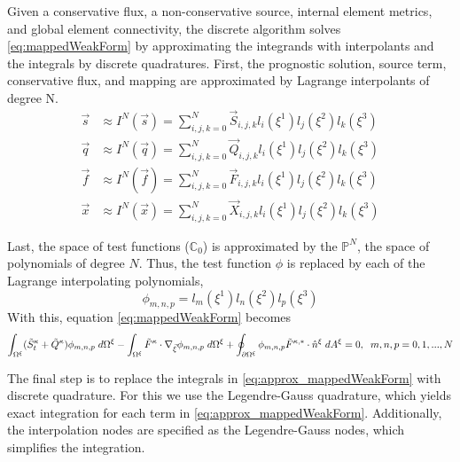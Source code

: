 \documentclass{softwaremanual}
\begin{document}
 Given a conservative flux, a non-conservative source, internal element metrics, and global element connectivity, the discrete algorithm solves \eqref{eq:mappedWeakForm} by approximating the integrands with interpolants and the integrals by discrete quadratures. First, the prognostic solution, source term, conservative flux, and mapping are approximated by Lagrange interpolants of degree N.
 \begin{subequations}
    \begin{align}
    \vec{s} &\approx I^N(\vec{s}) = \sum_{i,j,k=0}^N \vec{S}_{i,j,k} l_i(\xi^1) l_j(\xi^2) l_k(\xi^3) \\
    \vec{q} &\approx I^N(\vec{q}) = \sum_{i,j,k=0}^N \vec{Q}_{i,j,k} l_i(\xi^1) l_j(\xi^2) l_k(\xi^3) \\
    \vec{f} &\approx I^N(\vec{f}) = \sum_{i,j,k=0}^N \vec{F}_{i,j,k} l_i(\xi^1) l_j(\xi^2) l_k(\xi^3) \\
    \vec{x} &\approx I^N( \vec{x} ) = \sum_{i,j,k=0}^N \vec{X}_{i,j,k} l_i(\xi^1) l_j(\xi^2) l_k(\xi^3)
    \end{align}
 \end{subequations}

 
Last, the space of test functions ($\mathbb{C}_0$) is approximated by the $\mathbb{P}^N$, the space of polynomials of degree $N$. Thus, the test function $\phi$ is replaced by each of the Lagrange interpolating polynomials, 
 \begin{equation}
 \phi_{m,n,p} = l_m(\xi^1) l_n(\xi^2) l_p(\xi^3)
 \end{equation}
 With this, equation \eqref{eq:mappedWeakForm} becomes
   \begin{equation}
  \int_{\Omega^\xi} (\tilde{S}^\kappa_t + \tilde{Q}^\kappa) \phi_{m,n,p}  \hspace{1mm} d\Omega^\xi  - \int_{\Omega^\xi} \tilde{F}^\kappa \cdot \nabla_{\vec{\xi}} \phi_{m,n,p}   \hspace{1mm} d\Omega^\xi + \oint_{\partial \Omega^\xi} \phi_{m,n,p}  \tilde{F}^{\kappa,*}  \cdot \hat{n}^\xi \hspace{1mm} d A^\xi = 0, \hspace{2mm} m,n,p=0,1,...,N  \label{eq:approx_mappedWeakForm}
  \end{equation}
  
The final step is to replace the integrals in \eqref{eq:approx_mappedWeakForm} with discrete quadrature. For this we use the Legendre-Gauss quadrature, which yields exact integration for each term in \eqref{eq:approx_mappedWeakForm}. Additionally, the interpolation nodes are specified as the Legendre-Gauss nodes, which simplifies the integration.
\end{document}
